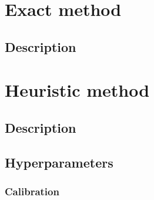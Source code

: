 \section{Exact method}
\label{chap:cplexm}
\subsection{Description}


\section{Heuristic method}
\label{chap:heuris}
\subsection{Description}

\subsection{Hyperparameters}

\subsubsection{Calibration}




